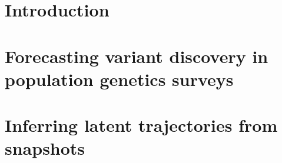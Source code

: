 \documentclass[twoside]{mitthesis} %
\begin{document}

\begin{abstract}
\end{abstract}





\tableofcontents
\listoffigures
\listoftables




%
%
%




\chapter{Introduction}
\label{ch:introduction}
{

}


\chapter{Forecasting variant discovery in population genetics surveys}
\label{ch:doubletrouble}

{

}


\chapter{Inferring latent trajectories from snapshots}
\label{ch:sbirr}

{


}
\end{document}
